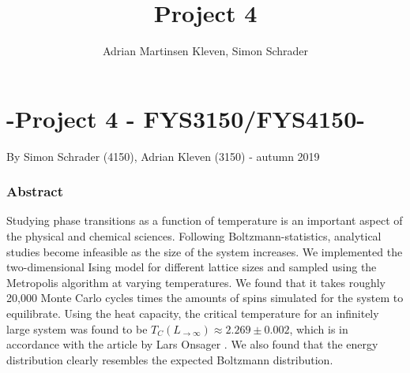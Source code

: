 \documentclass[10pt,a4paper]{article}
\author{Adrian Martinsen Kleven, Simon Schrader}
\title{Project 4}
\begin{document}
\part*{-Project 4 - FYS3150/FYS4150-
}
{\large By Simon Schrader (4150), Adrian Kleven (3150) - autumn 2019
}
\tableofcontents

\listoffigures
\listoftables


\clearpage

\section{Abstract}
Studying phase transitions as a function of temperature is an important aspect of the physical and chemical sciences. Following Boltzmann-statistics, analytical studies become infeasible as the size of the system increases.  We implemented the two-dimensional Ising model for different lattice sizes and sampled using the Metropolis algorithm at varying temperatures. We found that it takes roughly 20,000 Monte Carlo cycles times the amounts of spins simulated for the system to equilibrate. Using the heat capacity, the critical temperature for an infinitely large system was found to be $T_C(L_{\rightarrow \infty})\approx2.269\pm0.002$, which is in accordance with the article by Lars Onsager \cite{onsager1944two}. We also found that the energy distribution clearly resembles the expected Boltzmann distribution. 
\end{document}
